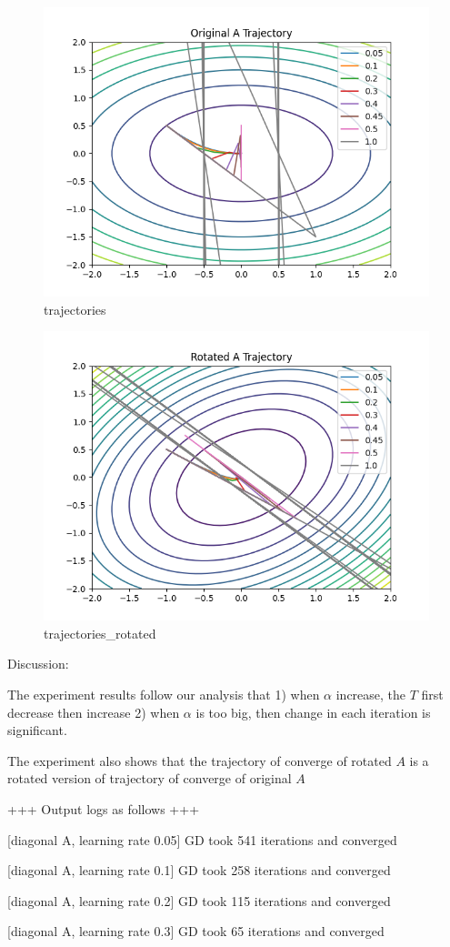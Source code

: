\begin{answer}

\begin{figure}[H]
    \centering
    \includegraphics[width=0.5\linewidth]{trajectories.png}
    \caption{trajectories}
    \label{fig:enter-label}
\end{figure}

\begin{figure}[H]
    \centering
    \includegraphics[width=0.5\linewidth]{trajectories_rotated.png}
    \caption{trajectories\_rotated}
    \label{fig:enter-label}
\end{figure}

Discussion:

The experiment results follow our analysis that 1) when $\alpha$ increase, the $T$ first decrease then increase 2) when $\alpha$ is too big, then change in each iteration is significant.

The experiment also shows that the trajectory of converge of rotated $A$ is a rotated version of trajectory of converge of original $A$ 

+++  Output logs as follows +++

[diagonal A, learning rate 0.05] GD took 541 iterations and converged

[diagonal A, learning rate 0.1] GD took 258 iterations and converged

[diagonal A, learning rate 0.2] GD took 115 iterations and converged

[diagonal A, learning rate 0.3] GD took 65 iterations and converged


\end{answer}
